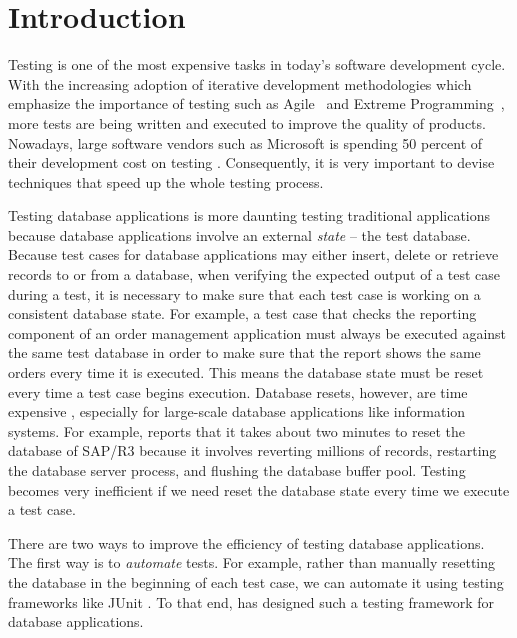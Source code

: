 \documentclass[authoryear,preprint,12pt]{elsarticle}
\begin{document}
\section{Introduction}
\label{intro}

Testing is one of the most expensive tasks in today's software development cycle.
With the increasing adoption of iterative development methodologies 
which emphasize the importance of testing
such as Agile~\cite{agile} and Extreme Programming~\cite{xp},
more tests are being written and executed to improve the quality of products.  
Nowadays, large software vendors such as Microsoft is spending 50 percent of their development cost on testing \cite{ms1, ms2}.
Consequently, it is very important to devise techniques that speed up the whole testing process.

Testing database applications is more daunting 
testing traditional applications because database applications involve an external \emph{state} -- the test database.
Because test cases for database applications may either insert, delete or retrieve records to or from a database,
when verifying the expected output of a test case during a test, 
it is necessary to make sure that each test case is working on a consistent database state.
For example, a test case that checks the reporting component
of an order management application must always
be executed against the same test database in order to
make sure that the report shows the same orders every
time it is executed.  
This means the database state must be reset every time a test case begins execution.
Database resets, however, are time expensive \cite{chatterjee04, cidr05}, especially for large-scale database applications like information systems.
For example, \cite{cidr05} reports that it takes about two minutes to reset the database of SAP/R3 because 
it involves reverting millions of records, restarting the database server process, and flushing the database buffer pool.  
Testing becomes very inefficient if we need reset the database state every time we execute a test case.

There are two ways to improve the efficiency of testing database applications.
The first way is to \emph{automate} tests.
For example, rather than manually resetting the database in the beginning of each test case,
we can automate it using testing frameworks like JUnit \cite{junit}.
To that end, \cite{cidr05} has designed such a testing framework for database applications.
\end{document}
